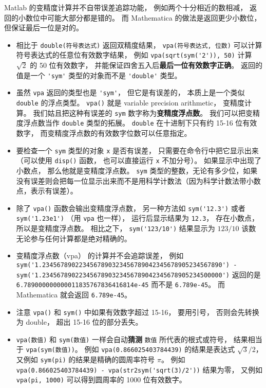 Matlab 的变精度计算并不自带误差追踪功能， 例如两个十分相近的数相减， 返回的小数位中可能大部分都是错的。 而 Mathematica 的做法是返回更少小数位， 但保证最后一位是对的。

\begin{itemize}
\item 相比于 \verb|double(符号表达式)| 返回双精度结果， \verb|vpa(符号表达式, 位数)| 可以计算符号表达式的任意位有效数字结果， 例如 \verb|vpa(sqrt(sym('2')), 50)| 计算 $\sqrt{2}$ 的 50 位有效数字， 并能保证四舍五入后\textbf{最后一位有效数字正确}。 返回的值是一个 \verb|'sym'| 类型的对象而不是 \verb|'double'| 类型。

\item 虽然 \verb|vpa| 返回的类型也是 \verb|'sym'|， 但它是有误差的， 本质上是一个类似 \verb|double| 的浮点类型。 \verb|vpa()| 就是 variable precision arithmetic， 变精度计算。 我们姑且把这种有误差的 \verb|sym| 数字称为\textbf{变精度浮点数}。 我们可以把变精度浮点数当作 \verb|double| 类型的拓展。 \verb|double| 在十进制下只有约 15-16 位有效数字， 而变精度浮点数的有效数字位数可以任意指定。

\item 要检查一个 \verb|sym| 类型的对象 \verb|x| 是否有误差， 只需要在命令行中把它显示出来（可以使用 \verb|disp()| 函数， 也可以直接运行 \verb|x| 不加分号）。 如果显示中出现了小数点， 那么他就是变精度浮点数。 \verb|sym| 类型的整数，无论有多少位，如果没有误差则会把每一位显示出来而不是用科学计数法（因为科学计数法带小数点，表示有误差）。

\item 除了 \verb|vpa()| 函数会输出变精度浮点数， 另一种方法如 \verb|sym('12.3')| 或者 \verb|sym('1.23e1')| （用 \verb|vpa| 也一样）， 运行后显示结果为 \verb|12.3|， 存在小数点， 所以是变精度浮点数。 相比之下， \verb|sym('123/10')| 结果显示为 $123/10$ 该数无论参与任何计算都是绝对精确的。

\item 变精度浮点数（vpa） 的计算并不会追踪误差， 例如 \verb|sym('1.2345678902234567890323456789042345678905234567890') - sym('1.2345678902234567890323456789042345678905234500000')| 返回的是 \verb|6.789000000000011835767836416814e-45| 而不是 \verb|6.789e-45|。 而 Mathematica 就会返回 \verb|6.789e-45|。

\item 注意 \verb|vpa()| 和 \verb|sym()| 中如果有效数字超过 15-16， 要用引号， 否则会先转换为 double， 超出 15-16 位的部分丢失。

\item \verb|vpa(数值)| 和 \verb|sym(数值)| 一样会自动\textbf{猜测} \verb|数值| 所代表的根式或符号， 结果相当于 \verb|vpa(sym(数值))|。 例如 \verb|vpa(0.866025403784439)| 的结果是表达式 $\sqrt{3}/2$， 又例如 \verb|sym(pi)| 的结果是精确的圆周率符号 $\pi$。 例如 \verb|vpa(0.866025403784439) - vpa(str2sym('sqrt(3)/2'))| 结果为零， 又例如 \verb|vpa(pi, 1000)| 可以得到圆周率的 1000 位有效数字。


\end{itemize}
